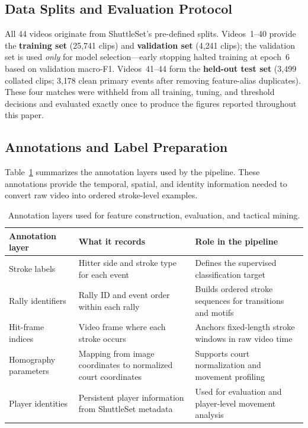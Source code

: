 \subsection{Data Splits and Evaluation Protocol}
\label{sec:splits}

All 44 videos originate from ShuttleSet's pre-defined splits.
Videos~1--40 provide the \textbf{training set} (25{,}741 clips) and
\textbf{validation set} (4{,}241 clips); the validation set is used
\emph{only} for model selection---early stopping halted training at
epoch~6 based on validation macro-F1.
Videos~41--44 form the \textbf{held-out test set} (3{,}499 collated
clips; 3{,}178 clean primary events after removing feature-alias
duplicates). These four matches were withheld from all training, tuning,
and threshold decisions and evaluated exactly once to produce the figures
reported throughout this paper.

\subsection{Annotations and Label Preparation}

Table~\ref{tab:annotation_layers} summarizes the annotation layers used by the
pipeline. These annotations provide the temporal, spatial, and identity
information needed to convert raw video into ordered stroke-level examples.

\begin{table}[h]
  \caption{Annotation layers used for feature construction, evaluation, and tactical mining.}
  \label{tab:annotation_layers}
  \centering
  \small
  \begin{tabular}{p{3.2cm} p{5.3cm} p{4.4cm}}
    \toprule
    Annotation layer & What it records & Role in the pipeline \\
    \midrule
    Stroke labels
      & Hitter side and stroke type for each event
      & Defines the supervised classification target \\[3pt]

    Rally identifiers
      & Rally ID and event order within each rally
      & Builds ordered stroke sequences for transitions and motifs \\[3pt]

    Hit-frame indices
      & Video frame where each stroke occurs
      & Anchors fixed-length stroke windows in raw video time \\[3pt]

    Homography parameters
      & Mapping from image coordinates to normalized court coordinates
      & Supports court normalization and movement profiling \\[3pt]

    Player identities
      & Persistent player information from ShuttleSet metadata
      & Used for evaluation and player-level movement analysis \\
    \bottomrule
  \end{tabular}
\end{table}

